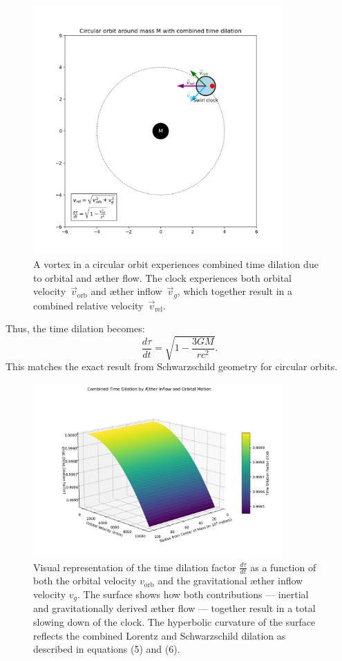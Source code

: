 \begin{figure}[htbp]
    \centering
    \includegraphics[width=0.85\textwidth]{images/08-BaanRondMassa}
    \caption{A vortex in a circular orbit experiences combined time dilation due to orbital and æther flow. The clock experiences both orbital velocity~$\vec{v}_{\mathrm{orb}}$ and æther inflow~$\vec{v}_g$, which together result in a combined relative velocity~$\vec{v}_{\mathrm{rel}}$.}
    \label{fig:BaanRondMassa}
\end{figure}

Thus, the time dilation becomes:
\[
\frac{d\tau}{dt} = \sqrt{1 - \frac{3GM}{rc^2}}. \tag{6}
\]
This matches the exact result from Schwarzschild geometry for circular orbits.

\begin{figure}[htbp]
    \centering
    \includegraphics[width=0.85\textwidth]{images/09-CombinedTimeDilationSurface}
    \caption{Visual representation of the time dilation factor \( \frac{d\tau}{dt} \) as a function of both the orbital velocity \( v_\text{orb} \) and the gravitational æther inflow velocity \( v_g \). The surface shows how both contributions — inertial and gravitationally derived æther flow — together result in a total slowing down of the clock. The hyperbolic curvature of the surface reflects the combined Lorentz and Schwarzschild dilation as described in equations (5) and (6).}
    \label{fig:TimeDialationCombined}
\end{figure}

